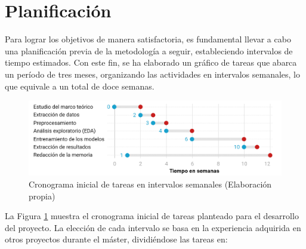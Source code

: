 \documentclass[12pt,a4paper]{report}
\begin{document}
\section{Planificación}

Para lograr los objetivos de manera satisfactoria, es fundamental llevar a cabo una planificación previa de la metodología a seguir, estableciendo intervalos de tiempo estimados. Con este fin, se ha elaborado un gráfico de tareas que abarca un período de tres meses, organizando las actividades en intervalos semanales, lo que equivale a un total de doce semanas.

\begin{figure}[H]
    \centering
    \includegraphics[width=1\textwidth]{Images/tfm-1.1.png}
    \caption{Cronograma inicial de tareas en intervalos semanales (Elaboración propia)}
    \label{fig:cronograma}
\end{figure}

La Figura \ref{fig:cronograma} muestra el cronograma inicial de tareas planteado para el desarrollo del proyecto. La elección de cada intervalo se basa en la experiencia adquirida en otros proyectos durante el máster, dividiéndose las tareas en:
\end{document}
